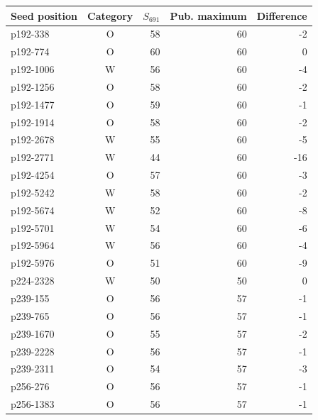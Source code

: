 \begin{tabular}{lcrrr}\toprule
Seed position & Category & $S_{691}$ & Pub. maximum & Difference\\\midrule
p192-338 & O & 58 & 60 & -2\\
p192-774 & O & 60 & 60 & 0\\
p192-1006 & W & 56 & 60 & -4\\
p192-1256 & O & 58 & 60 & -2\\
p192-1477 & O & 59 & 60 & -1\\
p192-1914 & O & 58 & 60 & -2\\
p192-2678 & W & 55 & 60 & -5\\
p192-2771 & W & 44 & 60 & -16\\
p192-4254 & O & 57 & 60 & -3\\
p192-5242 & W & 58 & 60 & -2\\
p192-5674 & W & 52 & 60 & -8\\
p192-5701 & W & 54 & 60 & -6\\
p192-5964 & W & 56 & 60 & -4\\
p192-5976 & O & 51 & 60 & -9\\
p224-2328 & W & 50 & 50 & 0\\
p239-155 & O & 56 & 57 & -1\\
p239-765 & O & 56 & 57 & -1\\
p239-1670 & O & 55 & 57 & -2\\
p239-2228 & O & 56 & 57 & -1\\
p239-2311 & O & 54 & 57 & -3\\
p256-276 & O & 56 & 57 & -1\\
p256-1383 & O & 56 & 57 & -1\\
\bottomrule\end{tabular}
